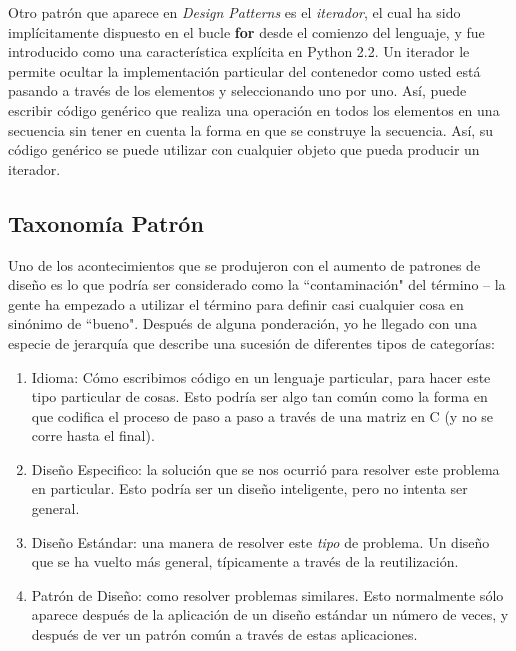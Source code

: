 Otro patrón que aparece en \textit{Design Patterns} es el \textit{iterador}, el cual ha sido implícitamente dispuesto en el bucle \textbf{for} desde el comienzo del lenguaje, y fue introducido como una característica explícita en Python 2.2. Un iterador le permite ocultar la implementación particular del contenedor como  usted está pasando a través de los elementos y seleccionando uno por uno. Así, puede escribir código genérico que realiza una operación en todos los elementos en una secuencia sin tener en cuenta la forma en que se construye la secuencia. Así, su código genérico se puede utilizar con cualquier objeto que pueda producir un iterador. \newline


\subsection*{Taxonomía Patrón}
\label{subsec:txp}

Uno de los acontecimientos que se produjeron con el aumento de patrones de diseño es lo que podría ser considerado como la ``contaminación" del término – la gente ha empezado a utilizar el término para definir casi cualquier cosa en sinónimo de  “bueno". Después de alguna ponderación, yo he llegado con una especie de jerarquía que describe una sucesión de diferentes tipos de categorías:      
\begin{enumerate}
    
    \item{Idioma:} Cómo escribimos código en un lenguaje particular, para hacer este tipo particular de cosas. Esto podría ser algo tan común como la forma en que codifica el proceso de paso a paso a través de una matriz en C (y no se corre hasta el final).
    
    \item{Diseño Especifico:} la solución que se nos ocurrió para resolver este problema en particular. Esto podría ser un diseño inteligente, pero no intenta ser general.
    
    \item{Diseño Estándar:} una manera de resolver este \textit{tipo} de problema. Un diseño que se ha vuelto más general, típicamente a través de la reutilización.
    
    \item{Patrón de Diseño:} como resolver problemas similares. Esto normalmente sólo aparece después de la aplicación de un diseño estándar un número de veces, y después de ver un patrón común a través de estas aplicaciones.
    
\end{enumerate}

